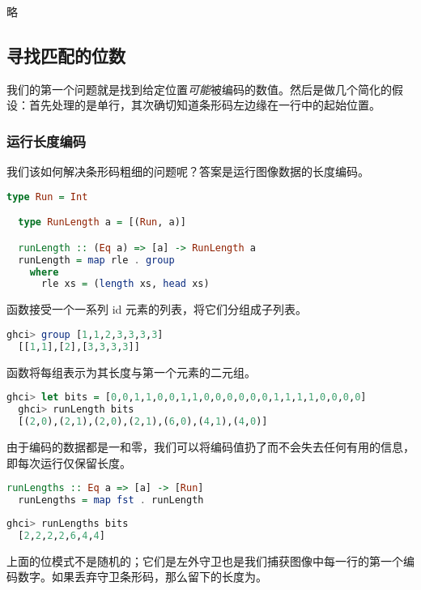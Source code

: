 \documentclass[./main.tex]{subfiles}
\begin{document}
略

\subsection*{寻找匹配的位数}

我们的第一个问题就是找到给定位置\textit{可能}被编码的数值。然后是做几个简化的假设：首先处理的是单行，其次确切知道条形码左边缘在一行中的起始位置。

\subsubsection*{运行长度编码}

我们该如何解决条形码粗细的问题呢？答案是运行图像数据的长度编码。

\begin{lstlisting}[language=Haskell]
  type Run = Int

  type RunLength a = [(Run, a)]

  runLength :: (Eq a) => [a] -> RunLength a
  runLength = map rle . group
    where
      rle xs = (length xs, head xs)
\end{lstlisting}

函数接受一个一系列 id 元素的列表，将它们分组成子列表。

\begin{lstlisting}[language=Haskell]
  ghci> group [1,1,2,3,3,3,3]
  [[1,1],[2],[3,3,3,3]]
\end{lstlisting}

函数将每组表示为其长度与第一个元素的二元组。

\begin{lstlisting}[language=Haskell]
  ghci> let bits = [0,0,1,1,0,0,1,1,0,0,0,0,0,0,1,1,1,1,0,0,0,0]
  ghci> runLength bits
  [(2,0),(2,1),(2,0),(2,1),(6,0),(4,1),(4,0)]
\end{lstlisting}

由于编码的数据都是一和零，我们可以将编码值扔了而不会失去任何有用的信息，即每次运行仅保留长度。

\begin{lstlisting}[language=Haskell]
  runLengths :: Eq a => [a] -> [Run]
  runLengths = map fst . runLength
\end{lstlisting}

\begin{lstlisting}[language=Haskell]
  ghci> runLengths bits
  [2,2,2,2,6,4,4]
\end{lstlisting}

上面的位模式不是随机的；它们是左外守卫也是我们捕获图像中每一行的第一个编码数字。如果丢弃守卫条形码，那么留下的长度为\acode{[2,6,4,4]}。
\end{document}
